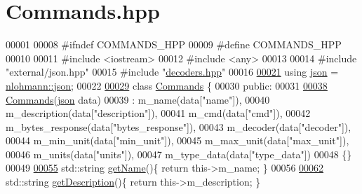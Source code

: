 \hypertarget{Commands_8hpp_source}{}\section{Commands.\+hpp}
\label{Commands_8hpp_source}

\begin{DoxyCode}
00001 
00008 \textcolor{preprocessor}{#ifndef COMMANDS\_HPP}
00009 \textcolor{preprocessor}{#define COMMANDS\_HPP}
00010 
00011 \textcolor{preprocessor}{#include <iostream>}
00012 \textcolor{preprocessor}{#include <any>}
00013 
00014 \textcolor{preprocessor}{#include "external/json.hpp"}
00015 \textcolor{preprocessor}{#include "\hyperlink{decoders_8hpp}{decoders.hpp}"}
00016 
\hyperlink{Commands_8hpp_ab701e3ac61a85b337ec5c1abaad6742d}{00021} \textcolor{keyword}{using} \hyperlink{Commands_8hpp_ab701e3ac61a85b337ec5c1abaad6742d}{json} = \hyperlink{Commands_8hpp_ab701e3ac61a85b337ec5c1abaad6742d}{nlohmann::json};
00022 
\hyperlink{classCommands}{00029} \textcolor{keyword}{class }\hyperlink{classCommands}{Commands} \{
00030 \textcolor{keyword}{public}:
00031 
\hyperlink{classCommands_ad71a0aafa9f942580b6c316ca07aef48}{00038}     \hyperlink{classCommands_ad71a0aafa9f942580b6c316ca07aef48}{Commands}(\hyperlink{Commands_8hpp_ab701e3ac61a85b337ec5c1abaad6742d}{json} data) 
00039     :   m\_name(data[\textcolor{stringliteral}{"name"}]),
00040         m\_description(data[\textcolor{stringliteral}{"description"}]),
00041         m\_cmd(data[\textcolor{stringliteral}{"cmd"}]),
00042         m\_bytes\_response(data[\textcolor{stringliteral}{"bytes\_response"}]),
00043         m\_decoder(data[\textcolor{stringliteral}{"decoder"}]),
00044         m\_min\_unit(data[\textcolor{stringliteral}{"min\_unit"}]),
00045         m\_max\_unit(data[\textcolor{stringliteral}{"max\_unit"}]),
00046         m\_units(data[\textcolor{stringliteral}{"units"}]),
00047         m\_type\_data(data[\textcolor{stringliteral}{"type\_data"}])
00048     \{\}
00049     
\hyperlink{classCommands_adf3d8a96310b1f4e57a6ecf0f2f153ea}{00055}     std::string \hyperlink{classCommands_adf3d8a96310b1f4e57a6ecf0f2f153ea}{getName}()\{ \textcolor{keywordflow}{return} this->m\_name; \}
00056 
\hyperlink{classCommands_ad82fe7dfcf1908423bdb59d048020e26}{00062}     std::string \hyperlink{classCommands_ad82fe7dfcf1908423bdb59d048020e26}{getDescription}()\{ \textcolor{keywordflow}{return} this->m\_description; \}

\end{DoxyCode}
